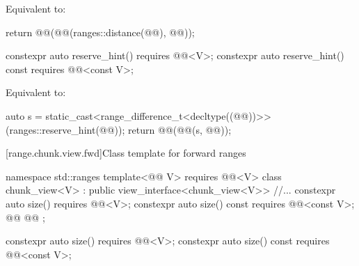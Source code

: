 \documentclass{wg21}
\begin{document}
\begin{itemdescr}
    \pnum
    \effects
    Equivalent to:
    \begin{codeblock}
        return @@(@@(ranges::distance(@@), @@));
    \end{codeblock}
\end{itemdescr}

\begin{addedblock}
\begin{itemdecl}
    constexpr auto reserve_hint() requires @@<V>;
    constexpr auto reserve_hint() const requires @@<const V>;
\end{itemdecl}

\begin{itemdescr}
    \pnum
    \effects
    Equivalent to:
    \begin{codeblock}
    	auto s = static_cast<range_difference_t<decltype((@@))>>(ranges::reserve_hint(@@));
        return @@(@@(s, @@));
    \end{codeblock}
\end{itemdescr}
\end{addedblock}

[range.chunk.view.fwd]{Class template  for forward ranges}

%
%
%
\begin{codeblock}
namespace std::ranges {
template<@@ V>
requires @@<V>
class chunk_view<V> : public view_interface<chunk_view<V>> {
   //...
   constexpr auto size() requires @@<V>;
   constexpr auto size() const requires @@<const V>;
   @@
   @@
};
}
\end{codeblock}

\begin{itemdecl}
    constexpr auto size() requires @@<V>;
    constexpr auto size() const requires @@<const V>;
\end{itemdecl}
\end{document}
